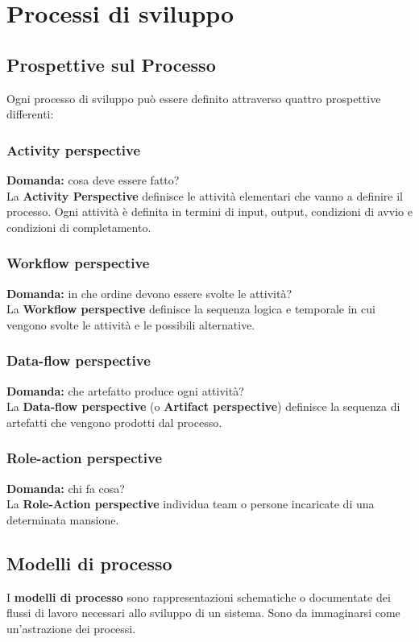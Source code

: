 \chapter{Processi di sviluppo}
\label{chap:processi}
\section{Prospettive sul Processo}
Ogni processo di sviluppo può essere definito attraverso quattro prospettive differenti:
\subsection{Activity perspective}
\textbf{Domanda:} cosa deve essere fatto? \\
La \textbf{Activity Perspective} definisce le attività elementari che vanno a definire il processo. Ogni attività è definita in termini di input, output, condizioni di avvio e condizioni di completamento.
\subsection{Workflow perspective}
\textbf{Domanda:} in che ordine devono essere svolte le attività? \\
La \textbf{Workflow perspective} definisce la sequenza logica e temporale in cui vengono svolte le attività e le possibili alternative.
\subsection{Data-flow perspective}
\textbf{Domanda:} che {artefatto} produce ogni attività? \\
La \textbf{Data-flow perspective} (o \textbf{Artifact perspective}) definisce la sequenza di artefatti che vengono prodotti dal processo.
\subsection{Role-action perspective}
\textbf{Domanda:} chi fa cosa? \\
La \textbf{Role-Action perspective} individua team o persone incaricate di una determinata mansione.
\section{Modelli di processo}
I \textbf{modelli di processo} sono rappresentazioni schematiche o documentate dei flussi di lavoro necessari allo sviluppo di un sistema. Sono da immaginarsi come un'astrazione dei processi. 
